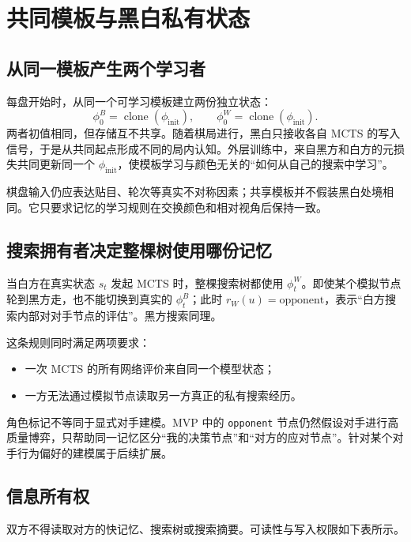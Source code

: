 \documentclass[UTF8,11pt,a4paper]{ctexart}
\newcommand{\memoryinit}{\phi_{\mathrm{init}}}
\newcommand{\code}[1]{\texttt{#1}}
\begin{document}
\section{共同模板与黑白私有状态}

\subsection{从同一模板产生两个学习者}

每盘开始时，从同一个可学习模板建立两份独立状态：
\[
  \phi^B_0=\operatorname{clone}(\memoryinit),\qquad
  \phi^W_0=\operatorname{clone}(\memoryinit).
\]
两者初值相同，但存储互不共享。随着棋局进行，黑白只接收各自 MCTS 的写入信号，于是从共同起点形成不同的局内认知。外层训练中，来自黑方和白方的元损失共同更新同一个 $\memoryinit$，使模板学习与颜色无关的“如何从自己的搜索中学习”。

棋盘输入仍应表达贴目、轮次等真实不对称因素；共享模板并不假装黑白处境相同。它只要求记忆的学习规则在交换颜色和相对视角后保持一致。

\subsection{搜索拥有者决定整棵树使用哪份记忆}

当白方在真实状态 $s_t$ 发起 MCTS 时，整棵搜索树都使用 $\phi^W_t$。即使某个模拟节点轮到黑方走，也不能切换到真实的 $\phi^B_t$；此时 $r_W(u)=\mathrm{opponent}$，表示“白方搜索内部对对手节点的评估”。黑方搜索同理。

这条规则同时满足两项要求：

\begin{itemize}
  \item 一次 MCTS 的所有网络评价来自同一个模型状态；
  \item 一方无法通过模拟节点读取另一方真正的私有搜索经历。
\end{itemize}

角色标记不等同于显式对手建模。MVP 中的 \code{opponent} 节点仍然假设对手进行高质量博弈，只帮助同一记忆区分“我的决策节点”和“对方的应对节点”。针对某个对手行为偏好的建模属于后续扩展。

\subsection{信息所有权}

双方不得读取对方的快记忆、搜索树或搜索摘要。可读性与写入权限如下表所示。
\end{document}
